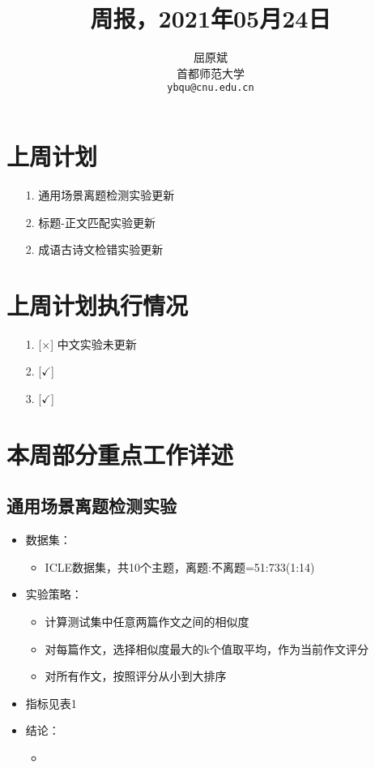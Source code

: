 \documentclass[11pt]{article}
\title{周报，2021年05月24日}
\author{屈原斌 \\
  首都师范大学 \\
    {\tt ybqu@cnu.edu.cn}}
\date{}
\begin{document}
\begin{CJK}{UTF8}{gkai}

\maketitle
\CJKindent

\section{上周计划}


\begin{itemize}
  \item [1.] 通用场景离题检测实验更新
  \item [2.] 标题-正文匹配实验更新
  \item [2.] 成语古诗文检错实验更新
\end{itemize}


\section{上周计划执行情况}
\begin{itemize}
\item [1.] [$\times$] 中文实验未更新 
\item [2.] [$\checkmark$] 
\item [3.] [$\checkmark$] 
\end{itemize}

\section{本周部分重点工作详述}

\subsection{通用场景离题检测实验}

\begin{itemize}
  \item 数据集：
  \begin{itemize}
    \item ICLE数据集，共10个主题，离题:不离题=51:733(1:14)
  \end{itemize}
  \item 实验策略：
  \begin{itemize}
    \item 计算测试集中任意两篇作文之间的相似度
    \item 对每篇作文，选择相似度最大的k个值取平均，作为当前作文评分
    \item 对所有作文，按照评分从小到大排序
  \end{itemize}
  \item 指标见表1
  \item 结论：
  \begin{itemize}
    \item 
  \end{itemize}
\end{itemize}


\end{CJK}
\end{document}
